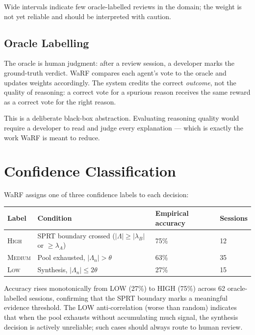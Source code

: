 \documentclass[11pt,a4paper]{article}
\begin{document}
Wide intervals indicate few oracle-labelled reviews in the domain; the
weight is not yet reliable and should be interpreted with caution.

\subsection{Oracle Labelling}

The oracle is human judgment: after a review session, a developer marks the
ground-truth verdict. WaRF compares each agent's vote to the oracle and
updates weights accordingly. The system credits the correct \emph{outcome},
not the quality of reasoning: a correct vote for a spurious reason receives
the same reward as a correct vote for the right reason.

This is a deliberate black-box abstraction. Evaluating reasoning quality
would require a developer to read and judge every explanation — which is
exactly the work WaRF is meant to reduce.

\section{Confidence Classification}

WaRF assigns one of three confidence labels to each decision:

\begin{center}
\begin{tabular}{llll}
\toprule
Label & Condition & Empirical accuracy & Sessions \\
\midrule
\textsc{High}   & SPRT boundary crossed ($|\Lambda| \geq |\lambda_B|$ or $\geq \lambda_A$) & 75\%  & 12 \\
\textsc{Medium} & Pool exhausted, $|\Lambda_n| > \theta$                                    & 63\%  & 35 \\
\textsc{Low}    & Synthesis, $|\Lambda_n| \leq 2\theta$                                     & 27\%  & 15 \\
\bottomrule
\end{tabular}
\end{center}

\smallskip
Accuracy rises monotonically from LOW (27\%) to HIGH (75\%) across 62
oracle-labelled sessions, confirming that the SPRT boundary marks a
meaningful evidence threshold. The LOW anti-correlation (worse than random)
indicates that when the pool exhausts without accumulating much signal, the
synthesis decision is actively unreliable; such cases should always route to
human review.
\end{document}
